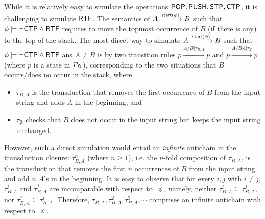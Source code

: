 While it is relatively easy to simulate the operations $\mathsf{POP}, \mathsf{PUSH}, \mathsf{STP}, \mathsf{CTP}$, %
it is challenging to  simulate $\mathsf{RTF}$. The semantics of $A \xrightarrow{{\mathsf{start} }(\phi)}B$ such that $\phi \models \neg {\sf CTP} \wedge {\sf RTF}$ requires to move the topmost occurrence of $B$ (if there is any) to the top of the stack. The most direct way to simulate  $A \xrightarrow{{\mathsf{start} }(\phi)}B$ such that $\phi \models \neg {\sf CTP} \wedge {\sf RTF}$ ans $A \neq B$ is by two transition rules $p \xrightarrow{A / B | \tau_{B, A}} p$ and  $p \xrightarrow{A / BA | \tau_{\not B}} p$
(where $p$ is a state in ${\mathcal{P} }_{\mathfrak{A} }$), corresponding to the two situations that $B$ occurs/does no occur in the stack, where 
\begin{itemize}
\item $\tau_{B, A}$ is the transduction that removes the first occurrence of $B$ from the input string and adds $A$ in the beginning, and
%
\item $\tau_{\not B}$ checks that $B$ does not occur in the input string but keeps the input string unchanged. 
\end{itemize}


However, such a direct simulation would entail an \emph{infinite} antichain in the transduction closure: $\tau^n_{B, A}$  (where $n \ge 1$), i.e. the $n$-fold composition of $\tau_{B,A}$, is the transduction that removes the first $n$ occurrences of $B$ from the input string and add $n$ $A$'s in the beginning. It is easy to observe that for every $i, j$ with $i \neq j$, $\tau^i_{B, A}$ and $\tau^j_{B, A}$ are incomparable with respect to $\preceq$, namely, neither $\tau^i_{B, A} \subseteq \tau^j_{B, A}$, nor $\tau^j_{B, A} \subseteq \tau^i_{B, A}$. Therefore, $\tau_{B, A}, \tau^2_{B, A}, \tau^3_{B, A}, \cdots$ comprises an infinite antichain with respect to $\preceq$. 

